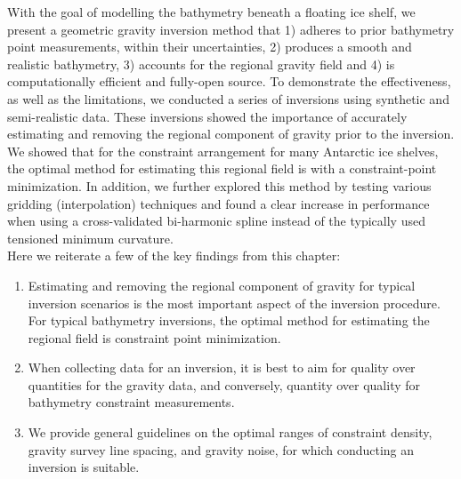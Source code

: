 With the goal of modelling the bathymetry beneath a floating ice shelf, we present a geometric gravity inversion method that 1) adheres to prior bathymetry point measurements, within their uncertainties, 2) produces a smooth and realistic bathymetry, 3) accounts for the regional gravity field and 4) is computationally efficient and fully-open source. To demonstrate the effectiveness, as well as the limitations, we conducted a series of inversions using synthetic and semi-realistic data. These inversions showed the importance of accurately estimating and removing the regional component of gravity prior to the inversion. We showed that for the constraint arrangement for many Antarctic ice shelves, the optimal method for estimating this regional field is with a constraint-point minimization. In addition, we further explored this method by testing various gridding (interpolation) techniques and found a clear increase in performance when using a cross-validated bi-harmonic spline instead of the typically used tensioned minimum curvature. \\

Here we reiterate a few of the key findings from this chapter:
\begin{enumerate}
    \item 
    Estimating and removing the regional component of gravity for typical inversion scenarios is the most important aspect of the inversion procedure. For typical bathymetry inversions, the optimal method for estimating the regional field is constraint point minimization.
    \item 
    When collecting data for an inversion, it is best to aim for quality over quantities for the gravity data, and conversely, quantity over quality for bathymetry constraint measurements.
    \item 
    We provide general guidelines on the optimal ranges of constraint density, gravity survey line spacing, and gravity noise, for which conducting an inversion is suitable. 
\end{enumerate}

